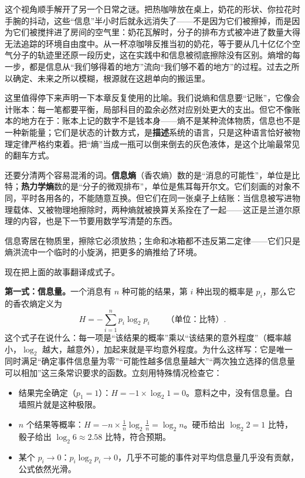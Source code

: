 这个视角顺手解开了另一个日常之谜。把热咖啡放在桌上，奶花的形状、你拉花时手腕的抖动，这些“信息”半小时后就永远消失了——不是因为它们被擦掉，而是因为它们被搅拌进了房间的空气里：奶花瓦解时，分子的排布方式被冲进了数量大得无法追踪的环境自由度中。从一杯凉咖啡反推当初的奶花，等于要从几十亿亿个空气分子的轨迹里还原一段历史，这在实践中和信息被彻底擦除没有区别。熵增的每一步，都是信息从“我们够得着的地方”流向“我们够不着的地方”的过程。过去之所以确定、未来之所以模糊，根源就在这趟单向的搬运里。

这里值得停下来声明一下本章反复使用的比喻。我们说熵和信息要“记账”，它像会计账本：每一笔都要平衡，局部科目的盈余必然对应别处更大的支出。但它不像账本的地方在于：账本上记的数字不是钱本身——熵不是某种流体物质，信息也不是一种新能量；它们是状态的计数方式，是\textbf{描述}系统的语言，只是这种语言恰好被物理定律严格约束着。把“熵”当成一瓶可以倒来倒去的灰色液体，是这个比喻最常见的翻车方式。

还要分清两个容易混淆的词。\textbf{信息熵}（香农熵）数的是“消息的可能性”，单位是比特；\textbf{热力学熵}数的是“分子的微观排布”，单位是焦耳每开尔文。它们刻画的对象不同，平时各用各的，不能随意互换。但它们在同一张桌子上结账：当信息被写进物理载体、又被物理地擦除时，两种熵就被换算关系拴在了一起——这正是兰道尔原理的内容，也是下一节要用数学写清楚的东西。


\begin{oneline}
信息寄居在物质里，擦除它必须放热；生命和冰箱都不违反第二定律——它们只是熵洪流中一个临时的小旋涡，把更多的熵推给了环境。
\end{oneline}


现在把上面的故事翻译成式子。

\textbf{第一式：信息量。}一个消息有 $n$ 种可能的结果，第 $i$ 种出现的概率是 $p_i$，那么它的香农熵定义为
\[
H=-\sum_{i=1}^{n}p_i\log_2 p_i \qquad \text{（单位：比特）}.
\]
这个式子在说什么：每一项是“该结果的概率”乘以“该结果的意外程度”（概率越小，$\log_2$ 越大，越意外），加起来就是平均意外程度。为什么这样写：它是唯一同时满足“确定事件信息量为零”“可能性越多信息量越大”“两次独立选择的信息量可以相加”这三条常识要求的函数。立刻用特殊情况检查它：

\begin{itemize}[leftmargin=2em]
\item 结果完全确定（$p_1=1$）：$H=-1\times\log_2 1=0$。意料之中，没有信息量。白墙照片就是这种极限。
\item $n$ 个结果等概率：$H=-n\times\frac1n\log_2\frac1n=\log_2 n$。硬币给出 $\log_2 2=1$ 比特，骰子给出 $\log_2 6\approx2.58$ 比特，符合预期。
\item 某个 $p_i\to 0$：$p_i\log_2 p_i\to 0$，几乎不可能的事件对平均信息量几乎没有贡献，公式依然光滑。
\end{itemize}


